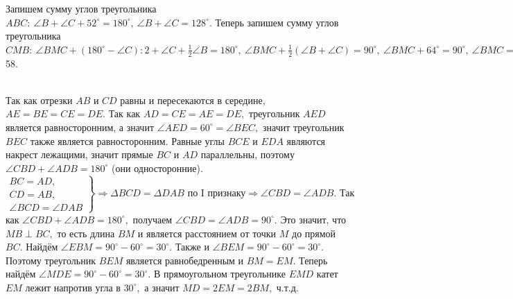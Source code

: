 \documentclass[12pt]{article}
\begin{document}
Запишем сумму углов треугольника $ABC:\ \angle B+\angle C+52^\circ=180^\circ,\ \angle B+\angle C=128^\circ.$ Теперь запишем сумму углов треугольника $CMB:\ \angle BMC+(180^\circ-\angle C):2+\angle C+\frac{1}{2}\angle B=180^\circ,\ \angle BMC+\frac{1}{2}(\angle B+\angle C)=90^\circ,\ \angle BMC+64^\circ=90^\circ,\ \angle BMC=26^\circ.$\\
58. \begin{figure}[ht!]
\end{figure}\\
Так как отрезки $AB$ и $CD$ равны и пересекаются в середине, $AE=BE=CE=DE.$ Так как $AD=CE=AE=DE,$ треугольник $AED$ является равносторонним, а значит $\angle AED=60^\circ=\angle BEC,$ значит треугольник $BEC$ также является равносторонним. Равные углы $BCE$ и $EDA$ являются накрест лежащими, значит прямые $BC$ и $AD$ параллельны, поэтому $\angle CBD+\angle ADB=180^\circ$ (они односторонние). $\left.\begin{array}{l}BC=AD,\\
CD=AB,\\
\angle BCD=\angle DAB  \end{array}\right\}\Rightarrow \Delta BCD=\Delta DAB\text{ по I признаку}\Rightarrow \angle CBD=\angle ADB.$ Так как $\angle CBD+\angle ADB=180^\circ,$ получаем $\angle CBD=\angle ADB=90^\circ.$ Это значит, что $MB\perp BC,$ то есть длина $BM$ и является расстоянием от точки $M$ до прямой $BC.$ Найдём $\angle EBM=90^\circ-60^\circ=30^\circ.$ Также и $\angle BEM=90^\circ-60^\circ=30^\circ.$ Поэтому треугольник $BEM$ является равнобедренным и $BM=EM.$ Теперь найдём $\angle MDE=90^\circ-60^\circ=30^\circ.$ В прямоугольном треугольнике $EMD$ катет $EM$ лежит напротив угла в $30^\circ,$ а значит $MD=2EM=2BM,$ ч.т.д.\\
\end{document}
